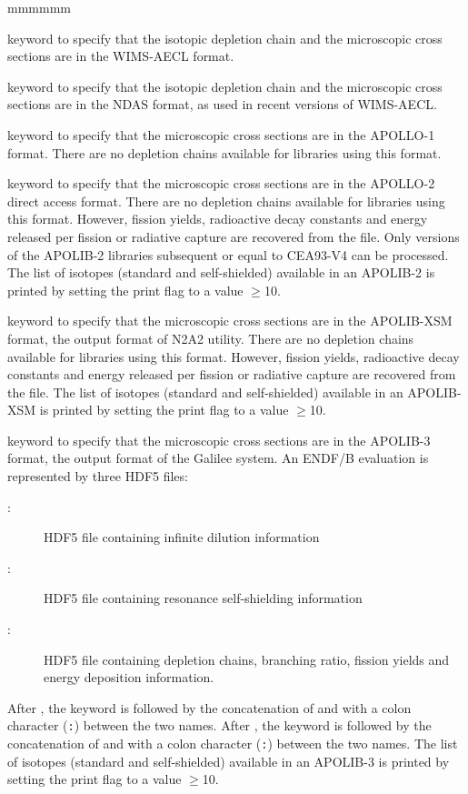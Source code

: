 \begin{ListeDeDescription}{mmmmmm}
\item[\moc{WIMSAECL}] keyword to specify that the isotopic depletion chain and the
microscopic cross sections are in the WIMS-AECL format.

\item[\moc{NDAS}] keyword to specify that the isotopic depletion chain and the
microscopic cross sections are in the NDAS format, as used in recent versions of WIMS-AECL.

\item[\moc{APLIB1}] keyword to specify that the microscopic cross sections are
in the APOLLO-1 format. There are no depletion chains available for libraries using this
format.

\item[\moc{APLIB2}] keyword to specify that the microscopic cross sections are
in the APOLLO-2 direct access format. There are no depletion chains available for libraries
using this format. However, fission yields, radioactive decay constants and
energy released per fission or radiative capture are recovered from the file.
Only versions of the APOLIB-2 libraries subsequent or equal to CEA93-V4 can be
processed. The list of isotopes (standard and self-shielded) available in an APOLIB-2
is printed by setting the print flag to a value $\ge$10.

\item[\moc{APXSM}] keyword to specify that the microscopic cross sections are
in the APOLIB-XSM format, the output format of N2A2 utility. There are no depletion chains available for libraries
using this format. However, fission yields, radioactive decay constants and
energy released per fission or radiative capture are recovered from the file.
The list of isotopes (standard and self-shielded) available in an APOLIB-XSM
is printed by setting the print flag to a value $\ge$10.

\item[\moc{APLIB3}] keyword to specify that the microscopic cross sections are
in the APOLIB-3 format, the output format of the Galilee system. An ENDF/B evaluation is
represented by three HDF5 files:
\begin{description}
\item[:] HDF5 file containing infinite dilution information
\item[:] HDF5 file containing resonance self-shielding information
\item[:] HDF5 file containing depletion chains, branching ratio, fission yields and energy deposition information.
\end{description}
After , the  keyword is followed by the concatenation of  and  with a colon character ({\tt :}) between
the two names. After , the  keyword is followed by the concatenation of  and  with a colon character ({\tt :}) between
the two names. The list of isotopes (standard and self-shielded) available in an APOLIB-3
is printed by setting the print flag to a value $\ge$10.


\end{ListeDeDescription}
